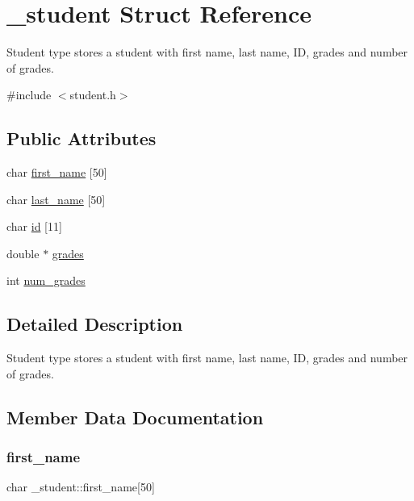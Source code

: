 \hypertarget{struct__student}{}\section{\+\_\+student Struct Reference}
\label{struct__student}


Student type stores a student with first name, last name, ID, grades and number of grades.  




{\ttfamily \#include $<$student.\+h$>$}

\subsection*{Public Attributes}
\begin{DoxyCompactItemize}
\item 
char \mbox{\hyperlink{struct__student_a272ec3136434e8d3281a615cf31cc987}{first\+\_\+name}} \mbox{[}50\mbox{]}
\item 
char \mbox{\hyperlink{struct__student_a18eb2a90671a2292c017b8f4fbde7eec}{last\+\_\+name}} \mbox{[}50\mbox{]}
\item 
char \mbox{\hyperlink{struct__student_adaee78078859cdecdbe9128dd655b748}{id}} \mbox{[}11\mbox{]}
\item 
double $\ast$ \mbox{\hyperlink{struct__student_ad0f75a9ff0f6104eb9e3bb3c4f7ad97b}{grades}}
\item 
int \mbox{\hyperlink{struct__student_a6592ee968ed2226737f45243e7602636}{num\+\_\+grades}}
\end{DoxyCompactItemize}


\subsection{Detailed Description}
Student type stores a student with first name, last name, ID, grades and number of grades. 

\subsection{Member Data Documentation}
\mbox{\label{struct__student_a272ec3136434e8d3281a615cf31cc987}} 
\subsubsection{\texorpdfstring{first\+\_\+name}{first\_name}}
{\footnotesize\ttfamily char \+\_\+student\+::first\+\_\+name\mbox{[}50\mbox{]}}

